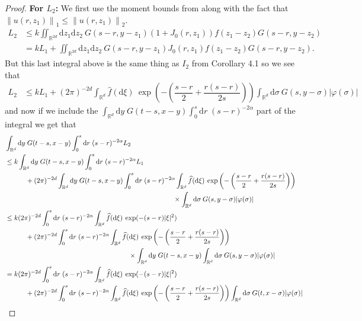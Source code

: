 \documentclass[a4paper,11pt]{article}%
\numberwithin{equation}{section}
\theoremstyle{plain}
\theoremstyle{definition}
\newcommand{\R}{\mathbb{R}}
\newcommand{\Norm}[1]{\left\|  #1   \right\|}
\newcommand{\ud}{\ensuremath{ \mathrm{d} }}
\begin{document}
\begin{proof}
	\noindent \textbf{For $L_2$:} We first use the moment bounds from \cite{CH19} along with the fact that $\Norm{u(r,z_1)}_1 \le \Norm{u(r,z_1)}_2$.
	\begin{align*}
	L_2 & \le k\iint_{\R^{2d}}\ud z_1 \ud z_2 \:G(s-r,y-z_1)(1+J_0(r,z_1))f(z_1-z_2)G(s-r,y-z_2)
	\\ &= kL_1 + \iint_{\R^{2d}}\ud z_1 \ud z_2 \:G(s-r,y-z_1)J_0(r,z_1)f(z_1-z_2)G(s-r,y-z_2).
	\end{align*}
	But this last integral above is the same thing as $I_2$ from Corollary 4.1 so we see that
	\begin{align*}
	L_2 &\le kL_1 + (2\pi)^{-2d}\int_{\R^d}\widehat{f}(\ud \xi) \: \exp\left(-\left(\dfrac{s-r}{2}+\dfrac{r(s-r)}{2s}\right)\right) \int_{\R^d}\ud \sigma \: G(s,y-\sigma)|\varphi(\sigma)|
	\end{align*}
	and now if we include the $\int_{\R^d}\ud y \;G(t-s,x-y)\int_0^s\ud r\; (s-r)^{-2\alpha}$ part of the integral we get that
	\begin{align*}
	& \int_{\R^d}\ud y \;G(t-s,x-y)\int_0^s\ud r\; (s-r)^{-2\alpha} L_2
	\\ & \le k\int_{\R^d}\ud y \;G(t-s,x-y)\int_0^s\ud r\; (s-r)^{-2\alpha} L_1
	\\ & \hspace{3em}+ (2\pi)^{-2d}\int_{\R^d}\ud y \;G(t-s,x-y)\int_0^s\ud r\; (s-r)^{-2\alpha}\int_{\R^d}\widehat{f}(\ud \xi) \: \exp\left(-\left(\dfrac{s-r}{2}+\dfrac{r(s-r)}{2s}\right)\right)
	\\ & \hspace{24.5em} \times  \int_{\R^d}\ud \sigma \: G(s,y-\sigma)|\varphi(\sigma)|
	\\ & \le k (2\pi)^{-2d} \int_0^s\ud r\; (s-r)^{-2\alpha}\int_{\R^d}\widehat{f} (\ud \xi)\: \exp(-(s-r)|\xi|^2)
	\\ & \hspace{3em}+ (2\pi)^{-2d} \int_0^s\ud r\; (s-r)^{-2\alpha}\int_{\R^d}\widehat{f}(\ud \xi) \: \exp\left(-\left(\dfrac{s-r}{2}+\dfrac{r(s-r)}{2s}\right)\right)
	\\ & \hspace{18 em} \times\int_{\R^d}\ud y \;G(t-s,x-y) \int_{\R^d}\ud \sigma \: G(s,y-\sigma)|\varphi(\sigma)|
	\\ & = k  (2\pi)^{-2d} \int_0^s\ud r\; (s-r)^{-2\alpha}\int_{\R^d}\widehat{f} (\ud \xi)\: \exp(-(s-r)|\xi|^2)
	\\ & \hspace{3em} +(2\pi)^{-2d}\int_0^s\ud r\; (s-r)^{-2\alpha}\int_{\R^d}\widehat{f}(\ud \xi) \: \exp\left(-\left(\dfrac{s-r}{2}+\dfrac{r(s-r)}{2s}\right)\right)\int_{\R^d}\ud \sigma \: G(t,x-\sigma)|\varphi(\sigma)|

\end{align*}
\end{proof}
\end{document}
